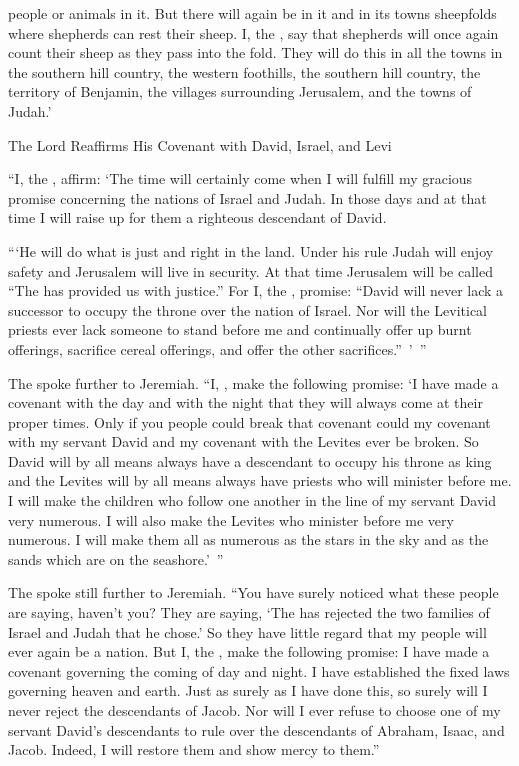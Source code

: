 {people
or animals
in it. But there will again
be in it and in its
towns
sheepfolds
where shepherds
can rest
their sheep.
I, the
{}, say
that shepherds will once again
count
their sheep
as they pass
into
the fold. They will do this in all the towns
in the southern hill country,
the western foothills,
the southern
hill country,
the territory of Benjamin,
the villages surrounding
Jerusalem,
and the towns
of Judah.’
\par }{\SH The Lord Reaffirms His Covenant with David, Israel, and Levi
\par }{\PP {}“I, the
{}, affirm: ‘The time
will certainly
come
when I will fulfill
my gracious
promise concerning
the nations of
Israel
and Judah.
In those
days
and at that time
I
will raise
up for them a righteous
descendant
of David.
\par }{\PP “‘He will do
what is just
and right
in the land.
Under his rule Judah
will enjoy safety
and Jerusalem
will live
in security.
At that
time Jerusalem will be called
“The
{}
has provided us with justice.”
For
I,
the {}, promise: “David
will never
lack
a successor
to occupy
the throne
over
the nation
of Israel.
Nor
will the Levitical
priests
ever lack
someone
to stand before
me and continually offer up
burnt offerings,
sacrifice cereal offerings,
and offer
the other sacrifices.” ’ ”
\par }{\PP {}The
{}
spoke
further to
Jeremiah.
“I,
{}, make the following
promise: ‘I have made a covenant
with the day
and with the night
that
they
will always come
at their proper times.
Only if
you people could break that covenant
could
my covenant
with
my servant
David and my covenant with
the Levites ever be
broken.
So David
will by all means always have a descendant
to occupy
his throne
as king
and the Levites
will by all means always have priests
who will minister before me.
I
will make
the children
who follow one another in the line of my servant
David
very numerous. I
will also make
the
Levites
who minister
before me very numerous.
I will make
them all as numerous
as the stars in the sky
and as the sands
which are on the seashore.’ ”
\par }{\PP {}The
{}
spoke
still further to
Jeremiah.
“You have
surely
noticed
what
these
people
are saying, haven’t
you? They are saying, ‘The
{}
has rejected
the
two
families
of Israel
and Judah
that
he chose.’
So they have little regard
that my people
will ever
again
be a nation.
But I,
the {}, make the following promise: I have made a covenant
governing the coming of day
and night.
I have established the fixed
laws governing
heaven
and earth.
Just as surely as
I have
done this, so surely will I never reject
the descendants
of Jacob.
Nor will I ever refuse
to choose
one of my servant
David’s
descendants
to rule
over the descendants
of Abraham,
Isaac,
and Jacob.
Indeed,
I will restore
them and show mercy to them.”

}
